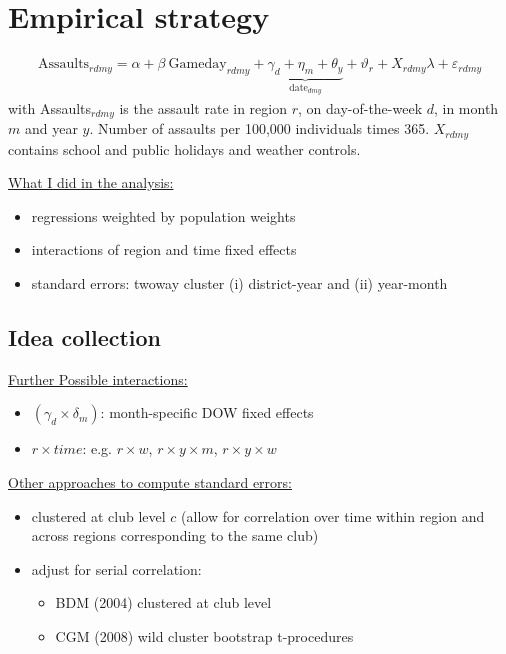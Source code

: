 \documentclass[11pt, a4paper]{article} %
\begin{document}
\newpage
\section{Empirical strategy}\label{sec_soc_ext:empirical_strategy}




\begin{align}
	\text{Assaults}_{rdmy} = \alpha + \beta\ \text{Gameday}_{rdmy} + \underbrace{\gamma_d +  \eta_m + \theta_y}_{\text{date}_{dmy}} + \vartheta_r + X_{rdmy} \lambda + \varepsilon_{rdmy}
	\label{eq_soc_ext:model}
\end{align}
with Assaults$_{rdmy}$ is the assault rate in region $r$, on day-of-the-week $d$, in month $m$ and year $y$. Number of assaults per 100,000 individuals times 365. $X_{rdmy}$ contains school and public holidays and weather controls.\newline

\underline{What I did in the analysis:} 
\begin{itemize}
	\item regressions weighted by population weights
	\item interactions of region and time fixed effects
	\item standard errors: twoway cluster (i) district-year and (ii) year-month
\end{itemize}



\subsection{Idea collection}
\underline{Further Possible interactions:} 
\begin{itemize}
	\item $(\gamma_d \times \delta_m)$: month-specific DOW fixed effects
	\item $r \times time$: e.g. $r \times w$, $r \times y \times m$,  $r \times y \times w$
\end{itemize}

\underline{Other approaches to compute standard errors:}
\begin{itemize}
	\item clustered at club level $c$ (allow for correlation over time within region and across regions corresponding to the same club)

	\item adjust for serial correlation: 
	\begin{itemize}
		\item BDM (2004) clustered at club level
		\item CGM (2008) wild cluster bootstrap t-procedures
	\end{itemize}
\end{itemize}
\end{document}
